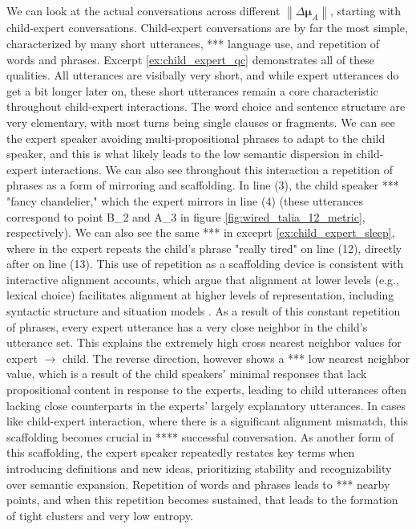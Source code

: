 \documentclass{article}
\theoremstyle{definition}
\numberwithin{table}{section}
\begin{document}
We can look at the actual conversations across different \begin{math}\left\|\Delta \boldsymbol{\mu}_A\right\|\end{math}, starting with child-expert conversations. Child-expert conversations are by far the most simple, characterized by many short utterances, *** language use, and repetition of words and phrases. Excerpt \ref{ex:child_expert_qc} demonstrates all of these qualities. All utterances are visibally very short, and while expert utterances do get a bit longer later on, these short utterances remain a core characteristic throughout child-expert interactions. The word choice and sentence structure are very elementary, with most turns being single clauses or fragments. We can see the expert speaker avoiding multi-propositional phrases to adapt to the child speaker, and this is what likely leads to the low semantic dispersion in child-expert interactions. We can also see throughout this interaction a repetition of phrases as a form of mirroring and scaffolding. In line (3), the child speaker *** "fancy chandelier," which the expert mirrors in line (4) (these utterances correspond to point B\_2 and A\_3 in figure \ref{fig:wired_talia_12_metric}, respectively). We can also see the same *** in exceprt \ref{ex:child_expert_sleep}, where in the expert repeats the child's phrase "really tired" on line (12), directly after on line (13). This use of repetition as a scaffolding device is consistent with interactive alignment accounts, which argue that alignment at lower levels (e.g., lexical choice) facilitates alignment at higher levels of representation, including syntactic structure and situation models \citep{menenti_toward_2012}. As a result of this constant repetition of phrases, every expert utterance has a very close neighbor in the child's utterance set. This explains the extremely high cross nearest neighbor values for expert $\rightarrow$ child. The reverse direction, however shows a *** low nearest neighbor value, which is a result of the child speakers' minimal responses that lack propositional content in response to the experts, leading to child utterances often lacking close counterparts in the experts' largely explanatory utterances. 
In cases like child-expert interaction, where there is a significant alignment mismatch, this scaffolding becomes crucial in **** successful conversation. As another form of this scaffolding, the expert speaker repeatedly restates key terms when introducing definitions and new ideas, prioritizing stability and recognizability over semantic expansion. Repetition of words and phrases leads to *** nearby points, and when this repetition becomes sustained, that leads to the formation of tight clusters and very low entropy. 
\end{document}

